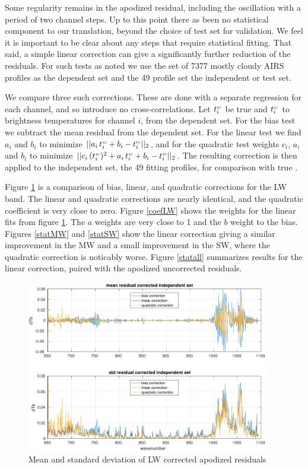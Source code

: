 \documentclass[11pt]{article}
\begin{document}
Some regularity remains in the apodized residual, including the
oscillation with a period of two channel steps.  Up to this point
there as been no statistical component to our translation, beyond
the choice of test set for validation.  We feel it is important to
be clear about any steps that require statistical fitting.  That
said, a simple linear correction can give a significantly further
reduction of the residuals.  For such tests as noted we use the set
of 7377 mostly cloudy AIRS profiles as the dependent set and the 49
profile set the independent or test set.

We compare three such corrections.  These are done with a separate
regression for each {\cris} channel, and so introduce no
cross-correlations.  Let $t^{\mbox{\tiny\textsc{tc}}}_i$ be true {\cris} and $t^{\mbox{\tiny\textsc{ac}}}_i$
{\airs} to {\cris} brightness temperatures for {\cris} channel $i$,
from the dependent set.  For the bias test we subtract the mean
residual from the dependent set.  For the linear test we find $a_i$
and $b_i$ to minimize $||a_i\,t^{\mbox{\tiny\textsc{ac}}}_i + b_i - t^{\mbox{\tiny\textsc{tc}}}_i||_2$, and for
the quadratic test weights $c_i$, $a_i$ and $b_i$ to minimize
$||c_i\,(t^{\mbox{\tiny\textsc{ac}}}_i)^2 + a_i\,t^{\mbox{\tiny\textsc{ac}}}_i + b_i - t^{\mbox{\tiny\textsc{tc}}}_i||_2$.  The resulting
correction is then applied to the independent set, the 49 fitting
profiles, for comparison with true {\cris}.

Figure \ref{statLW} is a comparison of bias, linear, and quadratic
corrections for the LW band.  The linear and quadratic corrections
are nearly identical, and the quadratic coefficient is very close to
zero.  Figure \ref{coefLW} shows the weights for the linear fits
from figure \ref{statLW}.  The $a$ weights are very close to 1 and
the $b$ weight to the bias.  Figures \ref{statMW} and \ref{statSW}
show the linear correction giving a similar improvement in the MW
and a small improvement in the SW, where the quadratic correction is
noticably worse.  Figure \ref{statall} summarizes results for the
linear correction, paired with the apodized uncorrected residuals.


\begin{figure} %
  \centering
  \includegraphics[height=7.5cm]{figures/a2cris_regr_LW.pdf}
  \caption{Mean and standard deviation of LW corrected apodized
    residuals}
  \label{statLW}
\end{figure}
\end{document}
